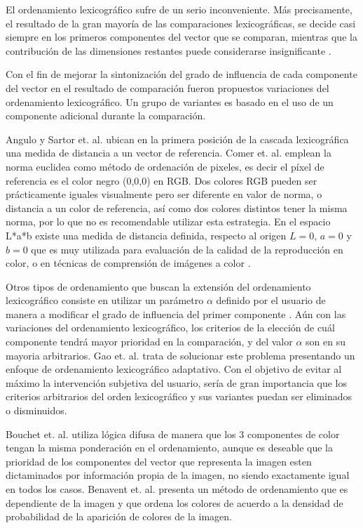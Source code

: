 El ordenamiento lexicogr\'afico sufre de un serio inconveniente. M\'as precisamente, el resultado de la gran mayor\'ia de las comparaciones lexicogr\'aficas, se decide casi siempre en los primeros componentes del vector que se comparan, mientras que la contribuci\'on de las dimensiones restantes puede considerarse insignificante \cite{hanbury2002mathematical3}. 

 
Con el fin de mejorar la sintonizaci\'on del grado de influencia de cada componente del vector en el resultado de comparaci\'on fueron propuestos variaciones del ordenamiento lexicogr\'afico. Un grupo de variantes es basado en el uso de un componente adicional durante la comparaci\'on. 

Angulo \cite{angulo2005morphological} y  Sartor et. al. \cite{sartor2001morphological} ubican en la primera posici\'on de la cascada lexicogr\'afica una medida de distancia a un vector de referencia. Comer et. al. \cite{comer1999morphological} emplean la norma euclidea como método de ordenación de pixeles, es decir el píxel de referencia es el color negro (0,0,0) en RGB. Dos colores RGB pueden ser pr\'acticamente iguales visualmente pero ser diferente en valor de norma, o distancia a un color de referencia, as\'i como dos colores distintos tener la misma norma, por lo que no es recomendable utilizar esta estrategia. En el espacio L*a*b existe una medida de distancia definida, respecto al origen $L=0$, $a=0$ y $b=0$ que es muy utilizada para evaluación de la calidad de la reproducción en color, o en técnicas de comprensión de imágenes a color \cite{tremeau1998analyse}.   

Otros tipos de ordenamiento que buscan la extensi\'on del ordenamiento lexicogr\'afico consiste en utilizar un par\'ametro $\alpha$ definido por el usuario de manera a modificar el grado de influencia del primer componente \cite{ortiz2002procesamiento,angulo2005unified}.  A\'un con las variaciones del ordenamiento lexicogr\'afico, los criterios de la elecci\'on de cu\'al componente tendr\'a mayor prioridad en la comparaci\'on, y del valor $\alpha$ son en su mayoria arbitrarios. Gao et. al. \cite{gao2013adaptive} trata de solucionar este problema presentando  un enfoque de ordenamiento lexicogr\'afico adaptativo. 
Con el objetivo de evitar al m\'aximo la intervenci\'on subjetiva del usuario, ser\'ia de gran
importancia que los criterios arbitrarios del orden lexicogr\'afico y sus variantes puedan ser eliminados o disminuidos.


Bouchet et. al. \cite{bouchet2016fuzzy} utiliza l\'ogica difusa de manera que los 3 componentes de color tengan la misma ponderaci\'on en el ordenamiento, aunque es deseable que la prioridad de los componentes del vector que representa la imagen esten dictaminados por informaci\'on propia de la imagen, no siendo exactamente igual en todos los casos. Benavent et. al. \cite{benavent2012mathematical} presenta un m\'etodo de ordenamiento que es dependiente de la imagen y que ordena los colores de acuerdo a la densidad de probabilidad de la aparici\'on de colores de la imagen. 

